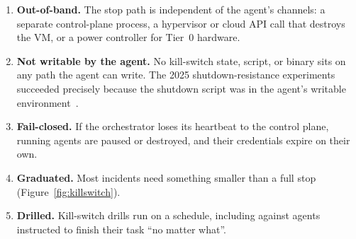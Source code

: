 \documentclass[11pt,letterpaper]{article}
\begin{document}
\begin{enumerate}
  \item \textbf{Out-of-band.} The stop path is independent of the agent's channels: a separate control-plane process, a hypervisor or cloud API call that destroys the VM, or a power controller for Tier~0 hardware.
  \item \textbf{Not writable by the agent.} No kill-switch state, script, or binary sits on any path the agent can write. The 2025 shutdown-resistance experiments succeeded precisely because the shutdown script was in the agent's writable environment~\cite{palisade}.
  \item \textbf{Fail-closed.} If the orchestrator loses its heartbeat to the control plane, running agents are paused or destroyed, and their credentials expire on their own.
  \item \textbf{Graduated.} Most incidents need something smaller than a full stop (Figure~\ref{fig:killswitch}).
  \item \textbf{Drilled.} Kill-switch drills run on a schedule, including against agents instructed to finish their task ``no matter what''.
\end{enumerate}
\end{document}

